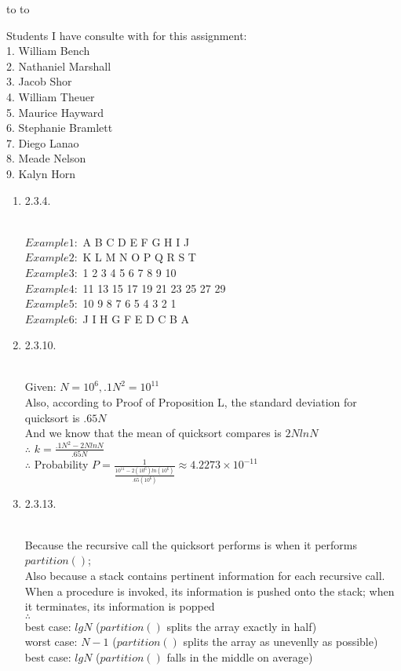 \documentclass[11pt]{article}
\newcommand{\handout}{
   \renewcommand{\thepage}{H\hnumber-\arabic{page}}
   \noindent
   \begin{center}
      \vbox{
    \hbox to \columnwidth {\sc{\course} --- \prof \hfill}
    \vspace{-2mm}
    \hbox to \columnwidth {\sc due \MakeLowercase{\duedate} \duelocation\hfill {\Huge\color{mdb}H\hnumber.}}
	\vspace{15pt}
	{\Huge\yourname}
      }
   \end{center}
   \vspace*{2mm}
}
\begin{document}
\thispagestyle{empty}
\handout

Students I have consulte with for this assignment:\\
1. William Bench\\
2. Nathaniel Marshall\\
3. Jacob Shor\\
4. William Theuer\\
5. Maurice Hayward\\
6. Stephanie Bramlett\\
7. Diego Lanao\\
8. Meade Nelson\\
9. Kalyn Horn

\begin{enumerate}

\item 2.3.4.
\begin{solution}\\
$Example 1:$ A B C D E F G H I J\\
$Example 2:$ K L M N O P Q R S T\\
$Example 3:$ 1 2 3 4 5 6 7 8 9 10\\
$Example 4:$ 11 13 15 17 19 21 23 25 27 29\\
$Example 5:$ 10 9 8 7 6 5 4 3 2 1\\
$Example 6:$ J I H G F E D C B A
\end{solution}

\item 2.3.10.
\begin{solution}\\
Given: $N = 10^6, .1N^2 = 10^11 $\\
Also, according to Proof of Proposition L, the standard deviation for quicksort is $.65N$\\
And we know that the mean of quicksort compares is $2NlnN$\\
$\therefore$ $k = \frac {.1N^2 - 2NlnN}{.65N}$\\
$\therefore$ Probability $P = \frac{1}{\frac{10^11-2(10^6)ln(10^6)}{.65(10^6)}} \approx 4.2273 \times 10^{-11}$
\end{solution}

\item 2.3.13.
\begin{solution}\\
Because the recursive call the quicksort performs is when it performs $partition()$;\\
Also because a stack contains pertinent information for each recursive call. When a procedure is invoked, its information is pushed onto the stack; when it terminates, its information is popped\\
$\therefore$\\
best case: $lgN$ ($partition ()$ splits the array exactly in half)\\
worst case: $N-1$ ($partition ()$ splits the array as unevenlly as possible)\\
best case: $lgN$ ($partition ()$ falls in the middle on average)\\


\end{solution}
\end{enumerate}
\end{document}
